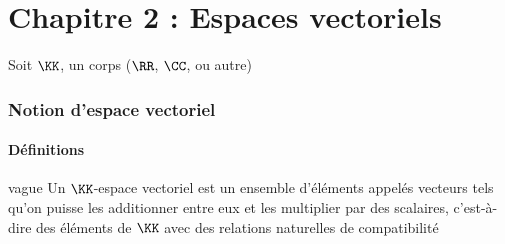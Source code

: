 \documentclass[../main.tex]{subfile}
\begin{document}
\part{Chapitre 2 : Espaces vectoriels}
Soit $\KK$, un corps ($\RR$, $\CC$, ou autre)

\section{Notion d'espace vectoriel}
\subsection{Définitions}
\begin{defi}{vague}
	Un $\KK$-espace vectoriel est un ensemble d'éléments appelés vecteurs tels qu'on puisse les additionner entre eux et les multiplier par des scalaires, c'est-à-dire des éléments de $\KK$
	avec des relations naturelles de compatibilité
\end{defi}
\end{document}
